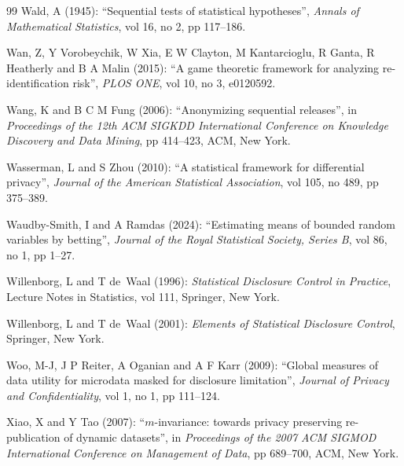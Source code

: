 \documentclass[11pt,a4paper]{article}
\theoremstyle{plain}
\theoremstyle{definition}
\theoremstyle{definition}
\theoremstyle{plain}
\begin{document}
\begin{thebibliography}{99}
Wald, A (1945): ``Sequential tests of statistical hypotheses'', \emph{Annals of Mathematical Statistics}, vol 16, no 2, pp 117--186.

Wan, Z, Y Vorobeychik, W Xia, E W Clayton, M Kantarcioglu, R Ganta, R Heatherly and B A Malin (2015): ``A game theoretic framework for analyzing re-identification risk'', \emph{PLOS ONE}, vol 10, no 3, e0120592.

Wang, K and B C M Fung (2006): ``Anonymizing sequential releases'', in \emph{Proceedings of the 12th ACM SIGKDD International Conference on Knowledge Discovery and Data Mining}, pp 414--423, ACM, New York.

Wasserman, L and S Zhou (2010): ``A statistical framework for differential privacy'', \emph{Journal of the American Statistical Association}, vol 105, no 489, pp 375--389.

Waudby-Smith, I and A Ramdas (2024): ``Estimating means of bounded random variables by betting'', \emph{Journal of the Royal Statistical Society, Series B}, vol 86, no 1, pp 1--27.

Willenborg, L and T de~Waal (1996): \emph{Statistical Disclosure Control in Practice}, Lecture Notes in Statistics, vol 111, Springer, New York.

Willenborg, L and T de~Waal (2001): \emph{Elements of Statistical Disclosure Control}, Springer, New York.

Woo, M-J, J P Reiter, A Oganian and A F Karr (2009): ``Global measures of data utility for microdata masked for disclosure limitation'', \emph{Journal of Privacy and Confidentiality}, vol 1, no 1, pp 111--124.

Xiao, X and Y Tao (2007): ``$m$-invariance: towards privacy preserving re-publication of dynamic datasets'', in \emph{Proceedings of the 2007 ACM SIGMOD International Conference on Management of Data}, pp 689--700, ACM, New York.

\end{thebibliography}
\end{document}
